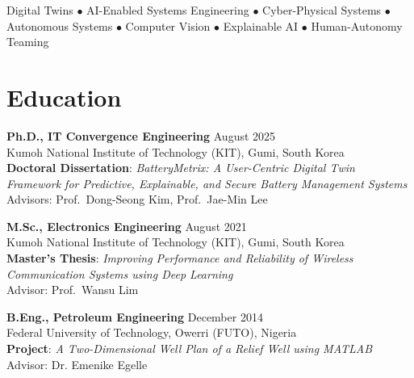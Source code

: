 \documentclass[11pt, letterpaper]{article}
\begin{document}
\noindent Digital Twins $\bullet$ AI-Enabled Systems Engineering $\bullet$
Cyber-Physical Systems $\bullet$
Autonomous Systems $\bullet$
Computer Vision $\bullet$
Explainable AI $\bullet$
Human-Autonomy Teaming


\section{Education}

\noindent
\textbf{Ph.D., IT Convergence Engineering} \hfill August 2025\\
Kumoh National Institute of Technology (KIT), Gumi, South Korea\\
\textbf{Doctoral Dissertation}: \textit{BatteryMetrix: A User-Centric Digital Twin Framework for Predictive, Explainable, and Secure Battery Management Systems}\\
Advisors: Prof.~Dong-Seong Kim, Prof.~Jae-Min Lee


\noindent
\textbf{M.Sc., Electronics Engineering} \hfill August 2021\\
Kumoh National Institute of Technology (KIT), Gumi, South Korea\\
\textbf{Master's Thesis}: \textit{Improving Performance and Reliability of Wireless Communication Systems using Deep Learning}\\
Advisor: Prof.~Wansu Lim


\noindent
\textbf{B.Eng., Petroleum Engineering} \hfill December 2014\\
Federal University of Technology, Owerri (FUTO), Nigeria\\
\textbf{Project}: \textit{A Two-Dimensional Well Plan of a Relief Well using MATLAB} \\
Advisor: Dr. Emenike Egelle



\end{document}
